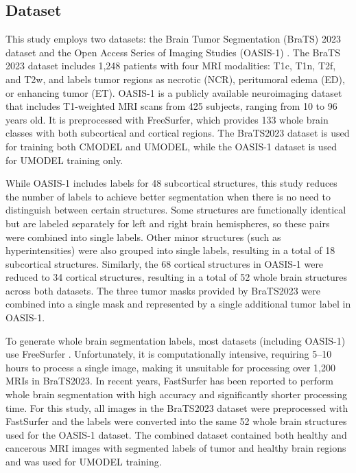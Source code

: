 \documentclass[11pt,letterpaper]{article}
\begin{document}
\subsection{Dataset}
This study employs two datasets: the Brain Tumor Segmentation (BraTS) 2023 dataset \cite{BraTS2023} and the Open Access Series of Imaging Studies (OASIS-1) \cite{marcus2010}. The BraTS 2023 dataset includes 1,248 patients with four MRI modalities: T1c, T1n, T2f, and T2w, and labels tumor regions as necrotic (NCR), peritumoral edema (ED), or enhancing tumor (ET). OASIS-1 is a publicly available neuroimaging dataset that includes T1-weighted MRI scans from 425 subjects, ranging from 10 to 96 years old. It is preprocessed with FreeSurfer, which provides 133 whole brain classes with both subcortical and cortical regions. The BraTS2023 dataset is used for training both CMODEL and UMODEL, while the OASIS-1 dataset is used for UMODEL training only.

While OASIS-1 includes labels for 48 subcortical structures, this study reduces the number of labels to achieve better segmentation when there is no need to distinguish between certain structures. Some structures are functionally identical but are labeled separately for left and right brain hemispheres, so these pairs were combined into single labels. Other minor structures (such as hyperintensities) were also grouped into single labels, resulting in a total of 18 subcortical structures. Similarly, the 68 cortical structures in OASIS-1 were reduced to 34 cortical structures, resulting in a total of 52 whole brain structures across both datasets. The three tumor masks provided by BraTS2023 were combined into a single mask and represented by a single additional tumor label in OASIS-1.

To generate whole brain segmentation labels, most datasets (including OASIS-1) use FreeSurfer \cite{fischl2012}. Unfortunately, it is computationally intensive, requiring 5--10 hours to process a single image, making it unsuitable for processing over 1,200 MRIs in BraTS2023. In recent years, FastSurfer has been reported to perform whole brain segmentation with high accuracy and significantly shorter processing time. For this study, all images in the BraTS2023 dataset were preprocessed with FastSurfer and the labels were converted into the same 52 whole brain structures used for the OASIS-1 dataset. The combined dataset contained both healthy and cancerous MRI images with segmented labels of tumor and healthy brain regions and was used for UMODEL training.
\end{document}
